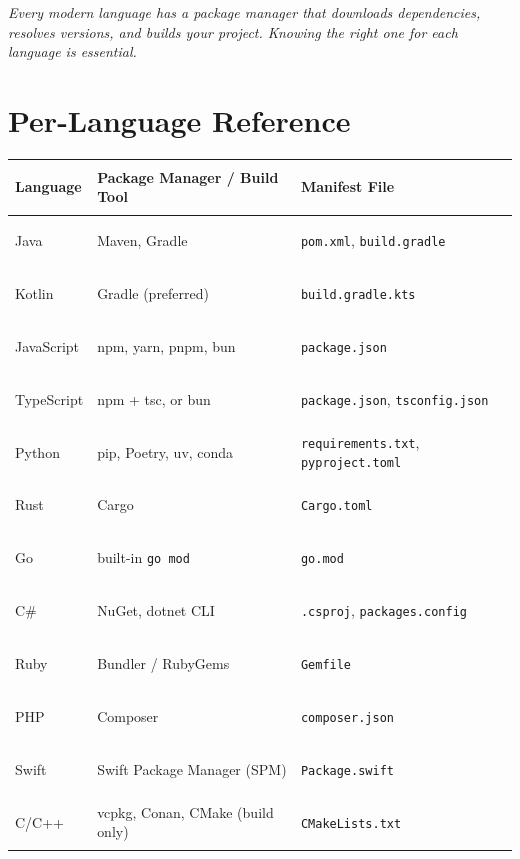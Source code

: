 \documentclass[11pt, letterpaper]{article}
\begin{document}
\vspace{6pt}
\begin{center}\small\itshape
  Every modern language has a package manager that downloads dependencies,
  resolves versions, and builds your project. Knowing the right one for each language is essential.
\end{center}

\section*{Per-Language Reference}

\noindent
{\small\renewcommand{\arraystretch}{1.5}
\begin{tabularx}{\textwidth}{>{\bfseries\raggedright\arraybackslash}p{2cm}
                              >{\raggedright\arraybackslash}p{4.5cm}
                              >{\raggedright\arraybackslash}X}
\toprule
\rowcolor{tableheadergrey}
\textbf{Language} & \textbf{Package Manager / Build Tool} & \textbf{Manifest File} \\
\midrule
\rowcolor{rowGr} Java       & Maven, Gradle              & \texttt{pom.xml}, \texttt{build.gradle} \\
\rowcolor{rowA}  Kotlin     & Gradle (preferred)         & \texttt{build.gradle.kts} \\
\rowcolor{rowGr} JavaScript & npm, yarn, pnpm, bun       & \texttt{package.json} \\
\rowcolor{rowA}  TypeScript & npm + tsc, or bun          & \texttt{package.json}, \texttt{tsconfig.json} \\
\rowcolor{rowGr} Python     & pip, Poetry, uv, conda     & \texttt{requirements.txt}, \texttt{pyproject.toml} \\
\rowcolor{rowA}  Rust       & Cargo                       & \texttt{Cargo.toml} \\
\rowcolor{rowGr} Go         & built-in \texttt{go mod}    & \texttt{go.mod} \\
\rowcolor{rowA}  C\#        & NuGet, dotnet CLI           & \texttt{.csproj}, \texttt{packages.config} \\
\rowcolor{rowGr} Ruby       & Bundler / RubyGems          & \texttt{Gemfile} \\
\rowcolor{rowA}  PHP        & Composer                    & \texttt{composer.json} \\
\rowcolor{rowGr} Swift      & Swift Package Manager (SPM) & \texttt{Package.swift} \\
\rowcolor{rowA}  C/C++      & vcpkg, Conan, CMake (build only) & \texttt{CMakeLists.txt} \\
\bottomrule
\end{tabularx}}
\end{document}

